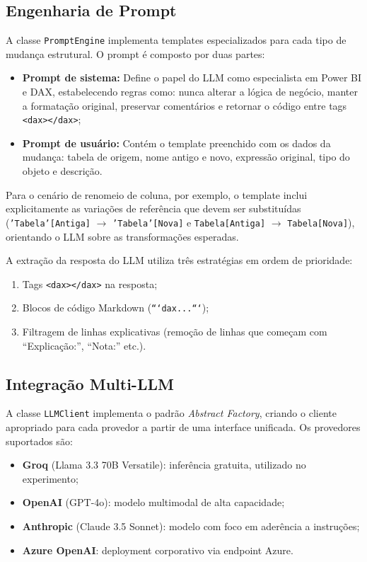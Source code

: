 \documentclass[
    12pt,               %
    openright,          %
    oneside,            %
    a4paper,            %
    chapter=TITLE,      %
    section=TITLE,      %
    brazil              %
]{abntex2}
\begin{document}
\subsection{Engenharia de Prompt}

A classe \texttt{PromptEngine} implementa templates especializados para cada tipo de mudança estrutural. O prompt é composto por duas partes:

\begin{itemize}
    \item \textbf{Prompt de sistema:} Define o papel do LLM como especialista em Power BI e DAX, estabelecendo regras como: nunca alterar a lógica de negócio, manter a formatação original, preservar comentários e retornar o código entre tags \texttt{<dax></dax>};
    \item \textbf{Prompt de usuário:} Contém o template preenchido com os dados da mudança: tabela de origem, nome antigo e novo, expressão original, tipo do objeto e descrição.
\end{itemize}

Para o cenário de renomeio de coluna, por exemplo, o template inclui explicitamente as variações de referência que devem ser substituídas (\texttt{'Tabela'[Antiga]} $\rightarrow$ \texttt{'Tabela'[Nova]} e \texttt{Tabela[Antiga]} $\rightarrow$ \texttt{Tabela[Nova]}), orientando o LLM sobre as transformações esperadas.

A extração da resposta do LLM utiliza três estratégias em ordem de prioridade:

\begin{enumerate}
    \item Tags \texttt{<dax></dax>} na resposta;
    \item Blocos de código Markdown (\texttt{```dax...```});
    \item Filtragem de linhas explicativas (remoção de linhas que começam com ``Explicação:'', ``Nota:'' etc.).
\end{enumerate}

\subsection{Integração Multi-LLM}

A classe \texttt{LLMClient} implementa o padrão \textit{Abstract Factory}, criando o cliente apropriado para cada provedor a partir de uma interface unificada. Os provedores suportados são:

\begin{itemize}
    \item \textbf{Groq} (Llama 3.3 70B Versatile): inferência gratuita, utilizado no experimento;
    \item \textbf{OpenAI} (GPT-4o): modelo multimodal de alta capacidade;
    \item \textbf{Anthropic} (Claude 3.5 Sonnet): modelo com foco em aderência a instruções;
    \item \textbf{Azure OpenAI}: deployment corporativo via endpoint Azure.
\end{itemize}
\end{document}
